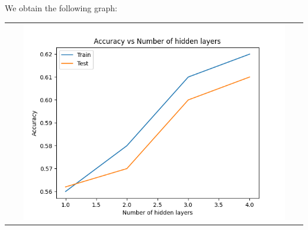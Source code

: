 \begin{enumerate}[label=(\alph*)]
\begin{enumerate}[label=\roman*.]
          \end{enumerate}
          We obtain the following graph:
          \begin{center}
              \begin{tabular}{c}
                  \includegraphics[width=0.9\textwidth]{./images/part_f.png}
              \end{tabular}
          \end{center}

\end{enumerate}


